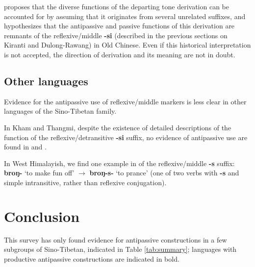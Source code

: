 \documentclass[oneside,a4paper,11pt]{article}
\newcommand{\ipa}[1]{{\phon\textbf{#1}}}
\begin{document}
 \citet{jacques16ssuffixes} proposes that the diverse functions of the departing tone derivation can be accounted for by assuming that it originates from several unrelated suffixes, and hypothesizes that the antipassive and passive functions of this derivation are remnants of the reflexive/middle \ipa{-si} (described in the previous sections on Kiranti and Dulong-Rawang) in Old Chinese. Even if this historical interpretation is not accepted, the direction of derivation and its meaning are not in doubt.

  \subsection{Other languages} \label{sec:other.refl}
Evidence for the antipassive use of reflexive/middle markers is less clear in other languages of the Sino-Tibetan family.
  
 In Kham and Thangmi, despite the existence of detailed descriptions of the function of the reflexive/detransitive \ipa{-si} suffix, no evidence of antipassive use are found in \citet[105;240-7]{watters02grammar} and \citet[372-6]{turin12thangmi}.
 
 In West Himalayish, we find one example in \citet[452;466]{widmer14bunan} of the reflexive/middle \ipa{-s} suffix: \ipa{broŋ-} `to make fun off' $\rightarrow$ \ipa{broŋ-s-} `to prance' (one of two verbs with \ipa{-s} and simple intransitive, rather than reflexive conjugation).
 

\section{Conclusion}
This survey has only found evidence for antipassive constructions in a few subgroups of Sino-Tibetan, indicated in Table \ref{tab:summary}; languages with productive antipassive constructions are indicated in bold.
\end{document}
